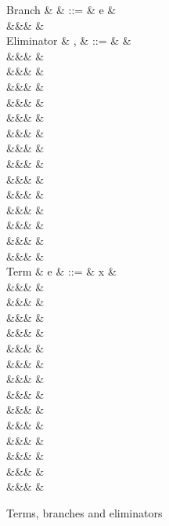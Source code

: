 \begin{figure}
\begin{syntaxfig}
\mbox{Branch}
&
\kappa
&
::=
&
e
&
\\
&&&
\sigma
&
\\[2mm]
\mbox{Eliminator}
&
\sigma, \tau
&
::=
&
&
\\
&&&
&
\\[1mm]
&&&
\elimUnit{\kappa}
&
\\
&&&
\elimUnitProj{\kappa}
&
\\[1mm]
&&&
\elimSum{\sigma}{\tau}
&
\\
&&&
\elimSumL{\sigma}
&
\\
&&&
\elimSumR{\sigma}
&
\\
&&&
\elimSumOnlyL{\sigma}{\tau}
&
\\
&&&
\elimSumProjL{\sigma}{\tau}
&
\\
&&&
\elimSumOnlyR{\sigma}{\tau}
&
\\
&&&
\elimSumProjR{\sigma}{\tau}
&
\\[1mm]
&&&
\elimProd{\sigma}
&
\\
&&&
\elimProdProj{\sigma}
&
\\[1mm]
&&&
\elimRoll{\sigma}
&
\\
&&&
\elimRollProj{\sigma}
&
\\[2mm]
\mbox{Term}
&
e
&
::=
&
x
&
\\[1mm]
&&&
\exUnit
&
\\[1mm]
&&&
&
\\
&&&
&
\\[1mm]
&&&
&
\\
&&&
&
\\[1mm]
&&&
&
\\
&&&
&
\\
&&&
&
\\[1mm]
&&&
\exFun{\sigma}
&
\\
&&&
\exFunProj{\elimSingletonProj{\sigma}{\exFun{\tau}}}
&
\\[1mm]
&&&
&
\\
&&&
&
\\[1mm]
&&&
&
\\
&&&
&
\end{syntaxfig}
\caption{Terms, branches and eliminators}
\end{figure}
